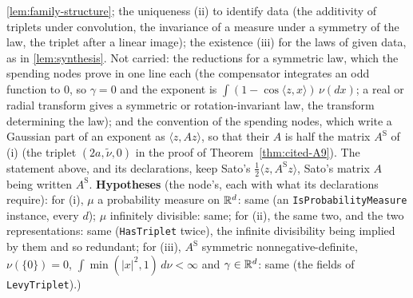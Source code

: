 \begin{theorem}
{\ref{lem:family-structure}; the uniqueness (ii) to identify data (the additivity of triplets under
convolution, the invariance of a \Levy{} measure under a symmetry of the law, the triplet after a
linear image); the existence (iii) for the laws of given data, as in \ref{lem:synthesis}. Not
carried: the reductions for a symmetric law, which the spending nodes prove in one line each (the
compensator integrates an odd function to $0$, so $\gamma = 0$ and the exponent is
$\int(1 - \cos\langle z, x\rangle)\,\nu(dx)$; a real or radial transform gives a symmetric or
rotation-invariant law, the transform determining the law); and the convention of the spending
nodes, which write a Gaussian part of an exponent as $\langle z, Az\rangle$, so that their $A$
is half the matrix $A^{\mathrm S}$ of (i) (the triplet $(2a, \tilde\nu, 0)$ in the proof of
Theorem~\ref{thm:cited-A9}). The statement above, and its declarations, keep Sato's
$\tfrac12\langle z, A^{\mathrm S}z\rangle$, Sato's matrix $A$ being written $A^{\mathrm S}$.
\textbf{Hypotheses} (the node's, each with what its declarations require): for (i), $\mu$ a probability
measure on $\mathbb{R}^d$: same (an \texttt{IsProbabilityMeasure} instance, every $d$); $\mu$ infinitely
divisible: same; for (ii), the same two, and the two representations: same (\texttt{HasTriplet}
twice), the infinite divisibility being implied by them and so redundant; for (iii), $A^{\mathrm S}$ symmetric
nonnegative-definite, $\nu(\{0\}) = 0$, $\int\min(|x|^2, 1)\,d\nu < \infty$ and $\gamma \in \mathbb{R}^d$:
same (the fields of \texttt{LevyTriplet}).)}
\end{theorem}

